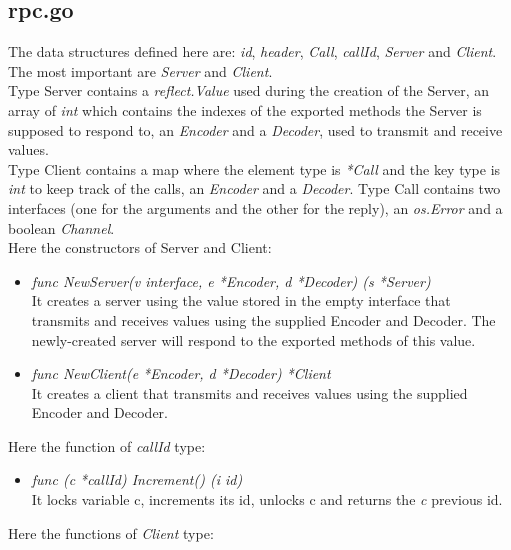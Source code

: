 \subsection{rpc.go}

The data structures defined here are: \emph{id}, \emph{header}, \emph{Call}, \emph{callId}, \emph{Server} and \emph{Client}. The most important are \emph{Server} and \emph{Client}.\\
Type Server contains a \emph{reflect.Value} used during the creation of the Server, an array of \emph{int} which contains the indexes of the exported methods the Server is supposed to respond to, an \emph{Encoder} and a \emph{Decoder}, used to transmit and receive values.\\
Type Client contains a map where the element type is \emph{*Call} and the key type is \emph{int} to keep track of the calls, an \emph{Encoder} and a \emph{Decoder}.
Type Call contains two interfaces (one for the arguments and the other for the reply), an \emph{os.Error} and a boolean \emph{Channel}.\\
Here the constructors of Server and Client:

\begin{itemize}
 
\item \emph{func NewServer(v interface{}, e *Encoder, d *Decoder) (s *Server)}\\
It creates a server using the value stored in the empty interface that transmits and receives values using the supplied Encoder and Decoder. The newly-created server will respond to the exported methods of this value.

\item \emph{func NewClient(e *Encoder, d *Decoder) *Client}\\
It creates a client that transmits and receives values using the supplied Encoder and Decoder.

\end{itemize}
Here the function of \emph{callId} type:

\begin{itemize}

\item \emph{func (c *callId) Increment() (i id)}\\
It locks variable c, increments its id, unlocks c and returns the \emph{c} previous id.  

\end{itemize}
Here the functions of \emph{Client} type:

